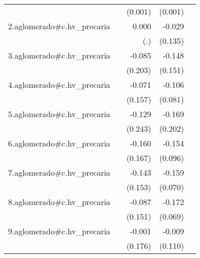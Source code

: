 {\begin{longtable}{l*{4}{D{.}{.}{-1}}}
            &                     &     (0.001)         &     (0.001)         &                     \\
\addlinespace
2.aglomerado#c.hv\_precaria&                     &       0.000         &      -0.029         &                     \\
            &                     &         (.)         &     (0.135)         &                     \\
\addlinespace
3.aglomerado#c.hv\_precaria&                     &      -0.085         &      -0.148         &                     \\
            &                     &     (0.203)         &     (0.151)         &                     \\
\addlinespace
4.aglomerado#c.hv\_precaria&                     &      -0.071         &      -0.106         &                     \\
            &                     &     (0.157)         &     (0.081)         &                     \\
\addlinespace
5.aglomerado#c.hv\_precaria&                     &      -0.129         &      -0.169         &                     \\
            &                     &     (0.243)         &     (0.202)         &                     \\
\addlinespace
6.aglomerado#c.hv\_precaria&                     &      -0.160         &      -0.154         &                     \\
            &                     &     (0.167)         &     (0.096)         &                     \\
\addlinespace
7.aglomerado#c.hv\_precaria&                     &      -0.143         &      -0.159\sym{*}  &                     \\
            &                     &     (0.153)         &     (0.070)         &                     \\
\addlinespace
8.aglomerado#c.hv\_precaria&                     &      -0.087         &      -0.172\sym{*}  &                     \\
            &                     &     (0.151)         &     (0.069)         &                     \\
\addlinespace
9.aglomerado#c.hv\_precaria&                     &      -0.001         &      -0.009         &                     \\
            &                     &     (0.176)         &     (0.110)         &                     \\

\end{longtable}}

